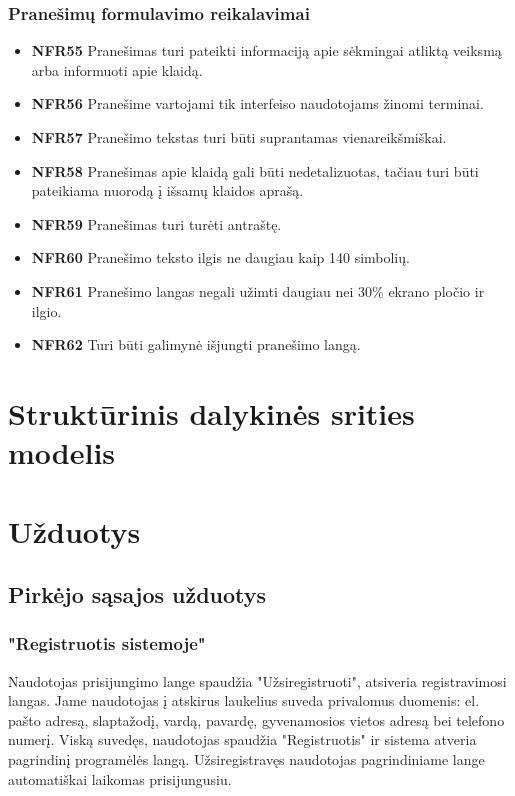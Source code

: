 \documentclass{VUMIFPSbakalaurinis}
\begin{document}
\subsubsection{Pranešimų formulavimo reikalavimai}
\begin{itemize}
	\item \textbf{NFR55} Pranešimas turi pateikti informaciją apie sėkmingai atliktą veiksmą arba informuoti apie klaidą.
	\item \textbf{NFR56} Pranešime vartojami tik interfeiso naudotojams žinomi terminai.
	\item \textbf{NFR57} Pranešimo tekstas turi būti suprantamas vienareikšmiškai.
	\item \textbf{NFR58} Pranešimas apie klaidą gali būti nedetalizuotas, tačiau turi būti pateikiama nuorodą į išsamų klaidos aprašą.
	\item \textbf{NFR59} Pranešimas turi turėti antraštę.
	\item \textbf{NFR60} Pranešimo teksto ilgis ne daugiau kaip 140 simbolių.
	\item \textbf{NFR61} Pranešimo langas negali užimti daugiau nei 30\% ekrano pločio ir ilgio.
	\item \textbf{NFR62} Turi būti galimynė išjungti pranešimo langą.
\end{itemize}

\section{Struktūrinis dalykinės srities modelis}

\section{Užduotys}
\subsection{Pirkėjo sąsajos užduotys}
\subsubsection{"Registruotis sistemoje"}
Naudotojas prisijungimo lange spaudžia "Užsiregistruoti", atsiveria registravimosi langas. Jame naudotojas į atskirus laukelius suveda privalomus duomenis: el. pašto adresą, slaptažodį, vardą, pavardę, gyvenamosios vietos adresą bei telefono numerį. Viską suvedęs, naudotojas spaudžia "Registruotis" ir sistema atveria pagrindinį programėlės langą. Užsiregistravęs naudotojas pagrindiniame lange automatiškai laikomas prisijungusiu.
\end{document}
